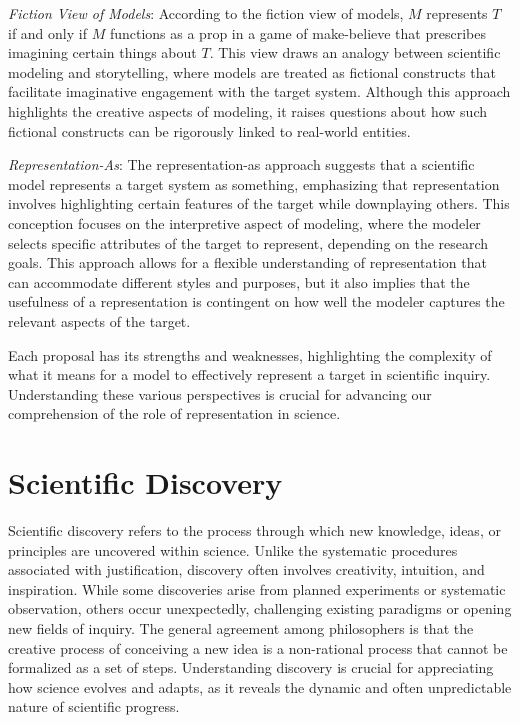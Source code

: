 \emph{Fiction View of Models}: According to the fiction view of models, $M$ represents $T$ if and only if $M$ functions as a prop in a game of make-believe that prescribes imagining certain things about $T$. This view draws an analogy between scientific modeling and storytelling, where models are treated as fictional constructs that facilitate imaginative engagement with the target system. Although this approach highlights the creative aspects of modeling, it raises questions about how such fictional constructs can be rigorously linked to real-world entities.

\emph{Representation-As}: The representation-as approach suggests that a scientific model represents a target system as something, emphasizing that representation involves highlighting certain features of the target while downplaying others. This conception focuses on the interpretive aspect of modeling, where the modeler selects specific attributes of the target to represent, depending on the research goals. This approach allows for a flexible understanding of representation that can accommodate different styles and purposes, but it also implies that the usefulness of a representation is contingent on how well the modeler captures the relevant aspects of the target.

Each proposal has its strengths and weaknesses, highlighting the complexity of what it means for a model to effectively represent a target in scientific inquiry. Understanding these various perspectives is crucial for advancing our comprehension of the role of representation in science.

%
%

\section{Scientific Discovery}

Scientific discovery refers to the process through which new knowledge, ideas, or principles are uncovered within science. Unlike the systematic procedures associated with justification, discovery often involves creativity, intuition, and inspiration. While some discoveries arise from planned experiments or systematic observation, others occur unexpectedly, challenging existing paradigms or opening new fields of inquiry. The general agreement among philosophers is that the creative process of conceiving a new idea is a non-rational process that cannot be formalized as a set of steps. Understanding discovery is crucial for appreciating how science evolves and adapts, as it reveals the dynamic and often unpredictable nature of scientific progress.

